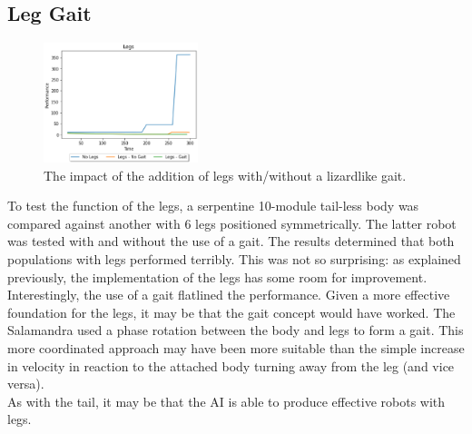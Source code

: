 \documentclass{article}
\begin{document}
\subsection{Leg Gait}
\label{sec:Leg Res}
\begin{figure}
    \centering
    \vspace*{-5mm}
    \includegraphics[width=0.4\textwidth]{legResults}
    \vspace*{-7mm}
    \caption{The impact of the addition of legs with/without a lizardlike gait.}
\end{figure}
To test the function of the legs, a serpentine 10-module tail-less body was compared against another with 6 legs positioned symmetrically. The latter robot was tested with and without the use of a gait. The results determined that both populations with legs performed terribly. This was not so surprising: as explained previously, the implementation of the legs has some room for improvement.\\
Interestingly, the use of a gait flatlined the performance. Given a more effective foundation for the legs, it may be that the gait concept would have worked. The Salamandra used a phase rotation between the body and legs to form a gait.  This more coordinated approach may have been more suitable than the simple increase in velocity in reaction to the attached body turning away from the leg (and vice versa). \\
 As with the tail, it may be that the AI is able to produce effective robots with legs. 
\end{document}
